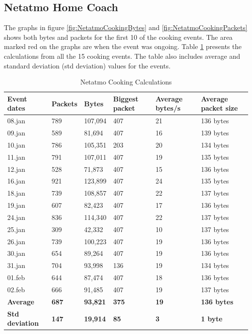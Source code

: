 \subsection{Netatmo Home Coach}
The graphs in figure \ref{fig:NetatmoCookingBytes} and \ref{fig:NetatmoCookingPackets} shows both bytes and packets for the first 10 of the cooking events. The area marked red on the graphs are when the event was ongoing. Table \ref{tab:NetatmoCookingCalculations} presents the calculations from all the 15 cooking events. The table also includes average and standard deviation (std deviation) values for the events. 

\begin{table}[!ht]
    \centering
    \caption{Netatmo Cooking Calculations}
    \begin{tabular}{|l|l|l|l|l|l|}
    \hline
        \textbf{Event dates} & \textbf{Packets} & \textbf{Bytes} & \textbf{Biggest packet} & \textbf{Average bytes/s} & \textbf{Average packet size}  \\ \hline
        08.jan & 789 & 107,094 & 407 & 21 & 136 bytes \\ \hline
        09.jan & 589 & 81,694 & 407 & 16 & 139 bytes \\ \hline
        10.jan & 786 & 105,351 & 203 & 20 & 134 bytes \\ \hline
        11.jan & 791 & 107,011 & 407 & 19 & 135 bytes \\ \hline
        12.jan & 528 & 71,873 & 407 & 15 & 136  bytes\\ \hline
        16.jan & 921 & 123,899 & 407 & 24 & 135 bytes \\ \hline
        18.jan & 739 & 108,857 & 407 & 22 & 137 bytes  \\ \hline
        19.jan & 607 & 82,423 & 407 & 17 & 136 bytes \\ \hline
        24.jan & 836 & 114,340 & 407 & 22 & 137 bytes  \\ \hline
        25.jan & 309 & 42,332 & 407 & 10 & 137 bytes \\ \hline
        26.jan & 739 & 100,223 & 407 & 19 & 136 bytes  \\ \hline
        30.jan & 654 & 89,264 & 407 & 19 & 136 bytes \\ \hline
        31.jan & 704 & 93,998 & 136 & 19 & 134 bytes \\ \hline
        01.feb & 644 & 87,474 & 407 & 18 & 136 bytes \\ \hline
        02.feb & 666 & 91,485 & 407 & 19 & 137 bytes \\ \hline
        \textbf{Average} &  \textbf{687}  &  \textbf{93,821}  &  \textbf{375}  &  \textbf{19}  &  \textbf{136 bytes} \\ \hline
        \textbf{Std deviation} &  \textbf{147}  & \textbf{19,914}  &  \textbf{85}  &  \textbf{3}  &  \textbf{1 byte} \\ \hline
    \end{tabular}
    \label{tab:NetatmoCookingCalculations}
\end{table}

